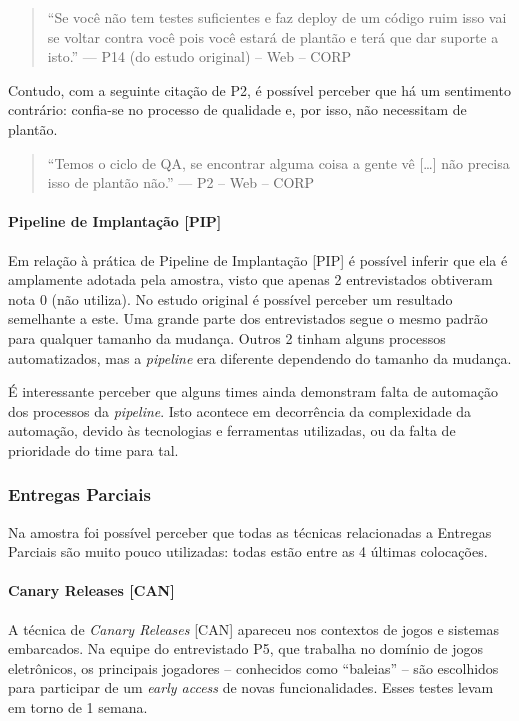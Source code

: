 \begin{quote}
    ``Se você não tem testes suficientes e faz deploy de um código ruim isso vai se voltar contra você pois você estará de plantão e terá que dar suporte a isto.'' --- P14 (do estudo original) -- Web -- CORP
\end{quote}


Contudo, com a seguinte citação de P2, é possível perceber que há um sentimento contrário: confia-se no processo de qualidade e, por isso, não necessitam de plantão.


\begin{quote}
    ``Temos o ciclo de QA, se encontrar alguma coisa a gente vê […] não precisa isso de plantão não.'' --- P2 -- Web -- CORP
\end{quote}

\paragraph{Pipeline de Implantação [PIP]}

Em relação à prática de Pipeline de Implantação [PIP] \cite{devopsBook} é possível inferir que ela é amplamente adotada pela amostra, visto que apenas 2 entrevistados obtiveram nota 0 (não utiliza). No estudo original é possível perceber um resultado semelhante a este. Uma grande parte dos entrevistados segue o mesmo padrão para qualquer tamanho da mudança. Outros 2 tinham alguns processos automatizados, mas a \emph{pipeline} era diferente dependendo do tamanho da mudança.

É interessante perceber que alguns times ainda demonstram falta de automação dos processos da \emph{pipeline}. Isto acontece em decorrência da complexidade da automação, devido às tecnologias e ferramentas utilizadas, ou da falta de prioridade do time para tal.
 
\subsubsection{Entregas Parciais}

Na amostra foi possível perceber que todas as técnicas relacionadas a Entregas Parciais são muito pouco utilizadas: todas estão entre as 4 últimas colocações.

\paragraph{Canary Releases [CAN]}

A técnica de \emph{Canary Releases} [CAN] \cite{continuousDeliveryBook} apareceu nos contextos de jogos e sistemas embarcados. Na equipe do entrevistado P5, que trabalha no domínio de jogos eletrônicos, os principais jogadores -- conhecidos como ``baleias'' -- são escolhidos para participar de um \emph{early access} de novas funcionalidades.  Esses testes levam em torno de 1 semana. 

